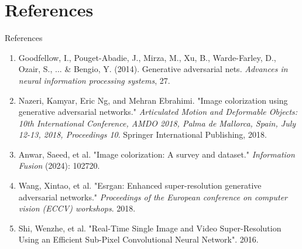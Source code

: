 \documentclass[aspectratio=169]{beamer}
\theoremstyle{definition}
\begin{document}
\section{References}
\begin{frame}{References}
    \begin{enumerate}
        \item Goodfellow, I., Pouget-Abadie, J., Mirza, M., Xu, B., Warde-Farley, D., Ozair, S., ... \& Bengio, Y. (2014). Generative adversarial nets. \emph{Advances in neural information processing systems}, 27.
        \item Nazeri, Kamyar, Eric Ng, and Mehran Ebrahimi. "Image colorization using generative adversarial networks." \emph{Articulated Motion and Deformable Objects: 10th International Conference, AMDO 2018, Palma de Mallorca, Spain, July 12-13, 2018, Proceedings 10}. Springer International Publishing, 2018.
        \item Anwar, Saeed, et al. "Image colorization: A survey and dataset." \emph{Information Fusion} (2024): 102720.
        \item Wang, Xintao, et al. "Esrgan: Enhanced super-resolution generative adversarial networks." \emph{Proceedings of the European conference on computer vision (ECCV) workshops}. 2018.
        \item Shi, Wenzhe, et al. "Real-Time Single Image and Video Super-Resolution Using an Efficient Sub-Pixel Convolutional Neural Network". 2016.
    \end{enumerate}
\end{frame}
\end{document}
